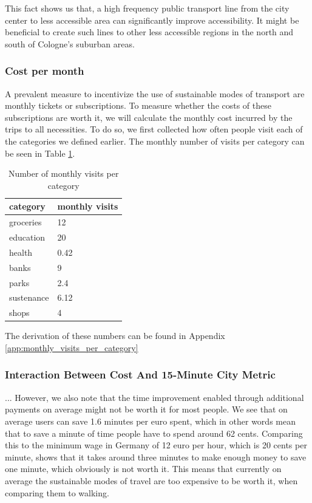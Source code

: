 This fact shows us that, a high frequency public transport line from the city center to less accessible area can significantly improve accessibility.
It might be beneficial to create such lines to other less accessible regions in the north and south of Cologne's suburban areas.


\subsubsection{Cost per month}

A prevalent measure to incentivize the use of sustainable modes of transport are monthly tickets or subscriptions.
To measure whether the costs of these subscriptions are worth it, we will calculate the monthly cost incurred by the trips to all necessities.
To do so, we first collected how often people visit each of the categories we defined earlier.
The monthly number of visits per category can be seen in Table \ref{tab:monthly_visits}.

\begin{table}
  \caption{Number of monthly visits per category}
  \label{tab:monthly_visits}
  \begin{center}
    \begin{tabular}[c]{l|l}
      category & monthly visits \\
      \hline
      groceries & 12 \\
      education & 20 \\
      health & 0.42 \\
      banks & 9 \\
      parks & 2.4 \\
      sustenance & 6.12 \\
      shops & 4 \\
      \hline
    \end{tabular}
  \end{center}
\end{table}

The derivation of these numbers can be found in Appendix \ref{app:monthly_visits_per_category}



\subsubsection{Interaction Between Cost And 15-Minute City Metric}

...
However, we also note that the time improvement enabled through additional payments on average might not be worth it for most people.
We see that on average users can save 1.6 minutes per euro spent, which in other words mean that to save a minute of time people have to spend around 62 cents.
Comparing this to the minimum wage in Germany of 12 euro per hour, which is 20 cents per minute, shows that it takes around three minutes to make enough money to save one minute, which obviously is not worth it.
This means that currently on average the sustainable modes of travel are too expensive to be worth it, when comparing them to walking.

